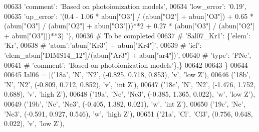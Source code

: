 \begin{DoxyCode}
00633                                        \textcolor{stringliteral}{'comment'}: \textcolor{stringliteral}{'Based on photoionization models'},
00634                                        \textcolor{stringliteral}{'low\_error'}: \textcolor{stringliteral}{'0.19'},
00635                                        \textcolor{stringliteral}{'up\_error'}: \textcolor{stringliteral}{'(0.4 - 1.06 * abun["O3"] / (abun["O2"] + abun["O3"]) +
       0.65 * (abun["O3"] / (abun["O2"] + abun["O3"]))**2 + 0.27 * (abun["O3"] / (abun["O2"] + abun["O3"]))**3) '}\},
00636 \textcolor{comment}{# To be completed}
00637 \textcolor{comment}{#                         'Sal07\_Kr1': \{'elem': 'Kr',}
00638 \textcolor{comment}{#                                       'atom':'abun["Kr3"] + abun["Kr4"]', }
00639 \textcolor{comment}{#                                       'icf': 'elem\_abun["DIMS14\_12"]/(abun["Ar3"] + abun["ar4"])',}
00640 \textcolor{comment}{#                                       'type': 'PNe',}
00641 \textcolor{comment}{#                                       'comment': 'Based on photoionization models'\},\}}
00642                          
00643                          \}
00644         
00645         Ial06 = [(\textcolor{stringliteral}{'18a'}, \textcolor{stringliteral}{'N'}, \textcolor{stringliteral}{'N2'}, (-0.825, 0.718, 0.853), \textcolor{stringliteral}{'v'}, \textcolor{stringliteral}{'low Z'}),
00646                  (\textcolor{stringliteral}{'18b'}, \textcolor{stringliteral}{'N'}, \textcolor{stringliteral}{'N2'}, (-0.809, 0.712, 0.852), \textcolor{stringliteral}{'v'}, \textcolor{stringliteral}{'int Z'}),
00647                  (\textcolor{stringliteral}{'18c'}, \textcolor{stringliteral}{'N'}, \textcolor{stringliteral}{'N2'}, (-1.476, 1.752, 0.688), \textcolor{stringliteral}{'v'}, \textcolor{stringliteral}{'high Z'}),
00648                  (\textcolor{stringliteral}{'19a'}, \textcolor{stringliteral}{'Ne'}, \textcolor{stringliteral}{'Ne3'}, (-0.385, 1.365, 0.022), \textcolor{stringliteral}{'w'}, \textcolor{stringliteral}{'low Z'}),
00649                  (\textcolor{stringliteral}{'19b'}, \textcolor{stringliteral}{'Ne'}, \textcolor{stringliteral}{'Ne3'}, (-0.405, 1.382, 0.021), \textcolor{stringliteral}{'w'}, \textcolor{stringliteral}{'int Z'}),
00650                  (\textcolor{stringliteral}{'19c'}, \textcolor{stringliteral}{'Ne'}, \textcolor{stringliteral}{'Ne3'}, (-0.591, 0.927, 0.546), \textcolor{stringliteral}{'w'}, \textcolor{stringliteral}{'high Z'}),
00651                  (\textcolor{stringliteral}{'21a'}, \textcolor{stringliteral}{'Cl'}, \textcolor{stringliteral}{'Cl3'}, (0.756, 0.648, 0.022), \textcolor{stringliteral}{'v'}, \textcolor{stringliteral}{'low Z'}),

\end{DoxyCode}
